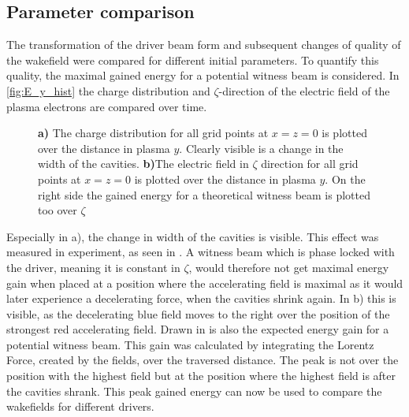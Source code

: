 \documentclass[bachelor_thesis]{subfiles}
\begin{document}
\subsection{Parameter comparison}
The transformation of the driver beam form and subsequent changes of quality of the wakefield were compared for different initial parameters. To quantify this quality, the maximal gained energy 
for a potential witness beam is considered. In \autoref{fig:E_y_hist} the charge distribution and $\zeta$-direction of the electric field of the plasma electrons are compared over time. 
\begin{figure}
	\centering
	\missingfigure{}
	\caption{
	\textbf{a)} The charge distribution for all grid points at $x=z=0$ is plotted over the distance in plasma $y$. Clearly visible is a change in the width of the cavities.
	\textbf{b)}The electric field in $\zeta$ direction for all grid points at $x=z=0$ is plotted over the distance in plasma $y$. On the right side the gained energy for a theoretical
	witness beam is plotted too over $\zeta$}
	\label{fig:E_y_hist}
\end{figure}
Especially in a), the change in width of the cavities is visible. This effect was measured in experiment, as seen in \cite{Schoebel2022}. A witness beam which is phase locked with the driver, meaning it is constant in $\zeta$,
would therefore not get maximal energy gain when placed at a position where the accelerating field is maximal as it would later experience a decelerating force, when the cavities shrink again.
In b) this is visible, as the decelerating blue field moves to the right over the position of the strongest red accelerating field. Drawn in is also the expected energy gain for a potential witness beam.
This gain was calculated by integrating the Lorentz Force, created by the fields, over the traversed distance. The peak is not over the position with the highest field but at the position where the highest field is after the cavities shrank.
This peak gained energy can now be used to compare the wakefields for different drivers.
\end{document}
